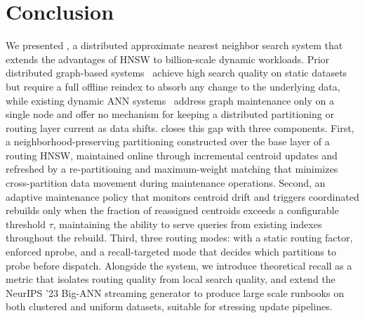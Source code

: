 \documentclass[sigconf,review,anonymous]{acmart}
\begin{document}


\section{Conclusion}

We presented \SystemName{}, a distributed approximate nearest neighbor search system that extends the advantages of HNSW \cite{malkov2018efficient} to billion-scale dynamic workloads. Prior distributed graph-based systems~\cite{deng2019pyramid, gottesbueren2025unleashing} achieve high search quality on static datasets but require a full offline reindex to absorb any change to the underlying data, while existing dynamic ANN systems~\cite{singh2021freshdiskann, mohoney2025quake, xu2023spfresh} address graph maintenance only on a single node and offer no mechanism for keeping a distributed partitioning or routing layer current as data shifts. \SystemName{} closes this gap with three components. First, a neighborhood-preserving partitioning constructed over the base layer of a routing HNSW, maintained online through incremental centroid updates and refreshed by a re-partitioning and maximum-weight matching that minimizes cross-partition data movement during maintenance operations. Second, an adaptive maintenance policy that monitors centroid drift and triggers coordinated rebuilds only when the fraction of reassigned centroids exceeds a configurable threshold $\tau$, maintaining the ability to serve queries from existing indexes throughout the rebuild. Third, three routing modes: with a static routing factor, enforced nprobe, and a recall-targeted mode that decides which partitions to probe before dispatch. Alongside the system, we introduce theoretical recall as a metric that isolates routing quality from local search quality, and extend the NeurIPS '23 Big-ANN streaming generator \cite{simhadri2024results} to produce large scale runbooks on both clustered and uniform datasets, suitable for stressing update pipelines. 
\end{document}
